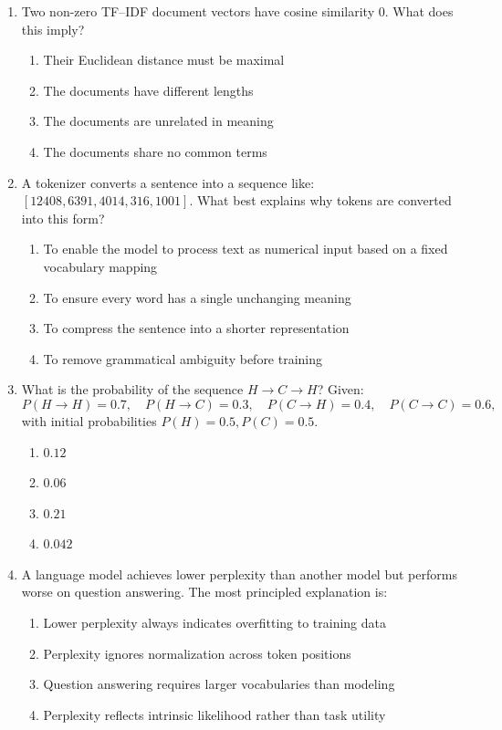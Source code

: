 \documentclass[12pt]{article}
\begin{document}
\begin{enumerate}[label=Q\arabic*.]
 \item Two non-zero TF--IDF document vectors have cosine similarity $0$. What does this imply?
 \begin{enumerate}[label=(\Alph*)]
     \item Their Euclidean distance must be maximal
     \item The documents have different lengths
     \item The documents are unrelated in meaning
     \item The documents share no common terms
 \end{enumerate}
 
 \item A tokenizer converts a sentence into a sequence like: \([12408, 6391, 4014, 316, 1001]\). What best explains why tokens are converted into this form?
 \begin{enumerate}[label=(\Alph*)]
     \item To enable the model to process text as numerical input based on a fixed vocabulary mapping
     \item To ensure every word has a single unchanging meaning
     \item To compress the sentence into a shorter representation
     \item To remove grammatical ambiguity before training
 \end{enumerate}
 
 \item What is the probability of the sequence $H \rightarrow C \rightarrow H$? Given:
 \[
 P(H \rightarrow H) = 0.7,\quad
 P(H \rightarrow C) = 0.3,\quad
 P(C \rightarrow H) = 0.4,\quad
 P(C \rightarrow C) = 0.6,
 \]
 with initial probabilities \(P(H) = 0.5, P(C) = 0.5\).
 \begin{enumerate}[label=(\Alph*)]
     \item $0.12$
     \item $0.06$
     \item $0.21$
     \item $0.042$
 \end{enumerate}
 
 \item A language model achieves lower perplexity than another model but performs worse on question answering. The most principled explanation is:
 \begin{enumerate}[label=(\Alph*)]
     \item Lower perplexity always indicates overfitting to training data
     \item Perplexity ignores normalization across token positions
     \item Question answering requires larger vocabularies than modeling
     \item Perplexity reflects intrinsic likelihood rather than task utility
 \end{enumerate}
 

\end{enumerate}
\end{document}
